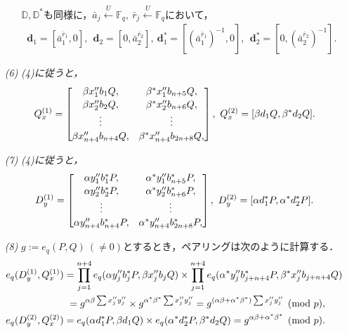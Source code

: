\documentclass[a4paper]{jsarticle}
\begin{document}
\begin{enumerate}
\begin{enumerate}
$\mathbb{D},\mathbb{D}^*$も同様に，$\bar{a}_j\overset{U}{\leftarrow}\mathbb{F}_q,\ \bar{r}_j \overset{U}{\leftarrow}\mathbb{F}_q$において，
\begin{align}
\bm{d}_1 = [\bar{a}^{\bar{r}_1}_1,0],\ \ \bm{d}_2 = [0,\bar{a}^{\bar{r}_2}_2],\ \bm{d}^*_1 = [(\bar{a}^{\bar{r}_1}_1)^{-1},0],\ \ \bm{d}^*_2 = [0,(\bar{a}^{\bar{r}_2}_2)^{-1}].
\end{align}
\end{enumerate}
\item[\it{(6)}] \it{(4)}に従うと，
\begin{align}
\displaystyle
\ Q_x^{(1)} = \begin{bmatrix} 
\beta x''_1 b_1 Q, & \beta^* x''_1 b_{n+5} Q, \vspace{0.02in}\\
\beta x''_2 b_2 Q, & \beta^* x''_2 b_{n+6} Q, \\
\vdots & \vdots \vspace{0.02in}\\
\beta x''_{n+4} b_{n+4} Q, & \beta^* x''_{n+4} b_{2n+8} Q, \\
\end{bmatrix} 
,\ Q_x^{(2)} = [\beta d_1 Q ,\beta^* d_2 Q].
\end{align}
\item[\it{(7)}] \it{(4)}に従うと，
\begin{align}
\displaystyle
\ D_y^{(1)} = \begin{bmatrix} 
\alpha y''_1 b^*_1 P, & \alpha^* y''_1 b^*_{n+5} P, \vspace{0.02in}\\
\alpha y''_2 b^*_2 P, & \alpha^* y''_2 b^*_{n+6} P, \\
\vdots & \vdots \vspace{0.02in}\\
\alpha y''_{n+4} b^*_{n+4} P, & \alpha^* y''_{n+4} b^*_{2n+8} P, \\
\end{bmatrix} 
,\ D_y^{(2)} = [\alpha d_1^* P ,\alpha^* d_2^* P].
\end{align}

\item[\it{(8)}] $g:=e_q(P,Q)\ (\ne 0)$とするとき，ペアリングは次のように計算する．
\begin{align}
e_q(D_y^{(1)}, Q_x^{(1)}) &= \prod_{j = 1}^{n+4} e_q(\alpha y''_j b_j^* P, \beta x''_j b_j Q)\times \prod_{j = 1}^{n+4} e_q(\alpha^* y''_j b_{j+n+4}^* P, \beta^* x''_j b_{j+n+4} Q) \notag\\&\ = g^{\alpha\beta\sum x_j''y_j''}\times g^{\alpha^*\beta^*\sum x_j''y_j''} =g^{(\alpha\beta + \alpha^*\beta^*)\sum  x_j''y_j''}\pmod{p},\\
e_q(D_y^{(2)}, Q_x^{(2)}) &=e_q(\alpha d_1^* P, \beta d_1 Q)\times e_q(\alpha^* d_2^* P, \beta^* d_2 Q) = g^{\alpha\beta + \alpha^*\beta^*}\pmod{p}.
\end{align}
\end{enumerate}
\end{document}
